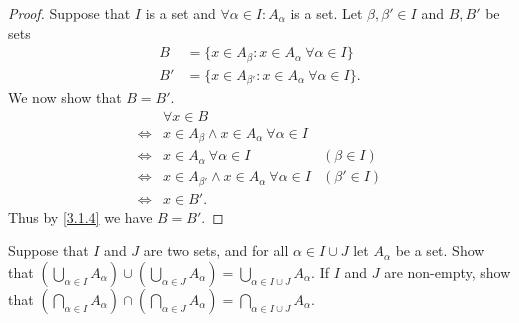 \begin{proof}
  Suppose that \(I\) is a set and \(\forall \alpha \in I : A_{\alpha}\) is a set.
  Let \(\beta, \beta' \in I\) and \(B, B'\) be sets
  \begin{align*}
    B  & = \{x \in A_{\beta} : x \in A_{\alpha} \ \forall \alpha \in I\}   \\
    B' & = \{x \in A_{\beta'} : x \in A_{\alpha} \ \forall \alpha \in I\}.
  \end{align*}
  We now show that \(B = B'\).
  \begin{align*}
         & \forall x \in B                                                                 \\
    \iff & x \in A_{\beta} \land x \in A_{\alpha} \ \forall \alpha \in I                   \\
    \iff & x \in A_{\alpha} \ \forall \alpha \in I                        & (\beta \in I)  \\
    \iff & x \in A_{\beta'} \land x \in A_{\alpha} \ \forall \alpha \in I & (\beta' \in I) \\
    \iff & x \in B'.
  \end{align*}
  Thus by \cref{3.1.4} we have \(B = B'\).
\end{proof}

\begin{ex}\label{ex:3.4.10}
  Suppose that \(I\) and \(J\) are two sets, and for all \(\alpha \in I \cup J\) let \(A_{\alpha}\) be a set.
  Show that \((\bigcup_{\alpha \in I} A_{\alpha}) \cup (\bigcup_{\alpha \in J} A_{\alpha}) = \bigcup_{\alpha \in I \cup J} A_{\alpha}\).
  If \(I\) and \(J\) are non-empty, show that \((\bigcap_{\alpha \in I} A_{\alpha}) \cap (\bigcap_{\alpha \in J} A_{\alpha}) = \bigcap_{\alpha \in I \cup J} A_{\alpha}\).
\end{ex}

